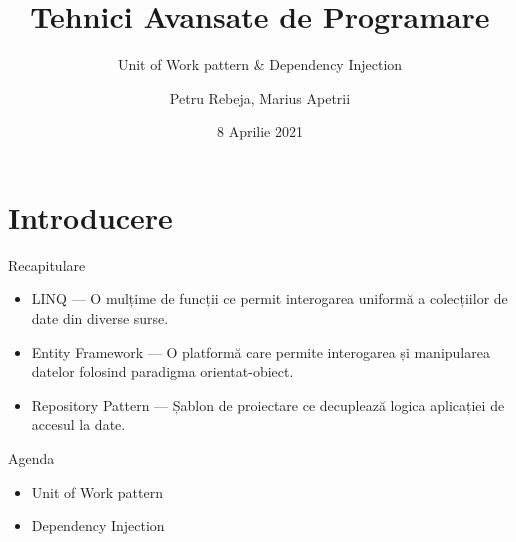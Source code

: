 \documentclass[presentation]{beamer}
\author{Petru Rebeja, Marius Apetrii}
\date{8 Aprilie 2021}
\title{Tehnici Avansate de Programare}
\subtitle{Unit of Work pattern \& Dependency Injection}
\institute[UAIC]{Facultatea de Matematică\\Universitatea Alexandru Ioan Cuza, Iași}
\begin{document}
\maketitle
\section{Introducere}
\label{sec:orgf39e77a}
\begin{frame}[label={sec:org0f08fa3}]{Recapitulare}
\begin{itemize}
\item \alert{LINQ} --- O mulțime de funcții ce permit interogarea uniformă a colecțiilor de date din diverse surse.
\item \alert{Entity Framework} --- O platformă care permite interogarea și manipularea datelor folosind paradigma orientat-obiect.
\item \alert{Repository Pattern} --- Șablon de proiectare ce decuplează logica aplicației de accesul la date.
\end{itemize}
\end{frame}
\begin{frame}[label={sec:orgb2b6948}]{Agenda}
\begin{itemize}
\item Unit of Work pattern
\item Dependency Injection
\end{itemize}
\end{frame}
\end{document}
